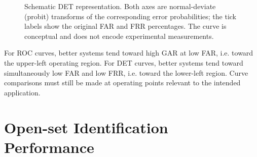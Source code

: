 \documentclass[11pt,a4paper,oneside]{report}
\newif\ifTikZAvailable
\begin{document}
\begin{figure}[htbp]
\centering

\ifTikZAvailable

\begin{tikzpicture}
\begin{axis}[
    width=0.90\textwidth,
    height=7.0cm,
    xmin=-3.15,
    xmax=-0.18,
    ymin=-3.15,
    ymax=-0.18,
    axis lines=left,
    xlabel={FAR (probit scale)},
    ylabel={FRR (probit scale)},
    xtick={-3.090,-2.326,-1.645,-1.282,-0.842,-0.253},
    ytick={-3.090,-2.326,-1.645,-1.282,-0.842,-0.253},
    xticklabels={0.1\%,1\%,5\%,10\%,20\%,40\%},
    yticklabels={0.1\%,1\%,5\%,10\%,20\%,40\%},
    tick label style={font=\small},
    label style={font=\small},
    grid=major,
    grid style={draw=MidGray!18},
    clip=false
]
\addplot[
    SapienzaRed,
    very thick,
    smooth
] coordinates {
    (-3.00,-0.30)
    (-2.65,-0.55)
    (-2.30,-0.85)
    (-1.95,-1.15)
    (-1.60,-1.47)
    (-1.25,-1.80)
    (-0.90,-2.16)
    (-0.55,-2.55)
    (-0.30,-2.95)
};
\end{axis}
\end{tikzpicture}

\else


\fi

\caption{
Schematic DET representation. Both axes are normal-deviate (probit)
transforms of the corresponding error probabilities; the tick labels show
the original FAR and FRR percentages. The curve is conceptual and does not
encode experimental measurements.
}
\label{fig:det}

\end{figure}

\begin{keyconcept}
For ROC curves, better systems tend toward high GAR at low FAR, i.e. toward
the upper-left operating region. For DET curves, better systems tend toward
simultaneously low FAR and low FRR, i.e. toward the lower-left region. Curve
comparisons must still be made at operating points relevant to the intended
application.
\end{keyconcept}

\section{Open-set Identification Performance}
\label{subsec:open-set-performance}
\end{document}
